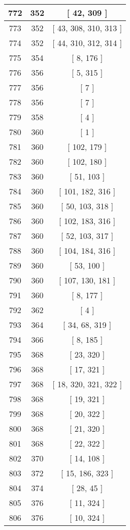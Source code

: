 \begin{center}
\begin{longtable}[H]{|| c c c ||}
\hline
772 & 352 & [ 42, 309 ] \\ 
\hline
773 & 352 & [ 43, 308, 310, 313 ] \\ 
\hline
774 & 352 & [ 44, 310, 312, 314 ] \\ 
\hline
775 & 354 & [ 8, 176 ] \\ 
\hline
776 & 356 & [ 5, 315 ] \\ 
\hline
777 & 356 & [ 7 ] \\ 
\hline
778 & 356 & [ 7 ] \\ 
\hline
779 & 358 & [ 4 ] \\ 
\hline
780 & 360 & [ 1 ] \\ 
\hline
781 & 360 & [ 102, 179 ] \\ 
\hline
782 & 360 & [ 102, 180 ] \\ 
\hline
783 & 360 & [ 51, 103 ] \\ 
\hline
784 & 360 & [ 101, 182, 316 ] \\ 
\hline
785 & 360 & [ 50, 103, 318 ] \\ 
\hline
786 & 360 & [ 102, 183, 316 ] \\ 
\hline
787 & 360 & [ 52, 103, 317 ] \\ 
\hline
788 & 360 & [ 104, 184, 316 ] \\ 
\hline
789 & 360 & [ 53, 100 ] \\ 
\hline
790 & 360 & [ 107, 130, 181 ] \\ 
\hline
791 & 360 & [ 8, 177 ] \\ 
\hline
792 & 362 & [ 4 ] \\ 
\hline
793 & 364 & [ 34, 68, 319 ] \\ 
\hline
794 & 366 & [ 8, 185 ] \\ 
\hline
795 & 368 & [ 23, 320 ] \\ 
\hline
796 & 368 & [ 17, 321 ] \\ 
\hline
797 & 368 & [ 18, 320, 321, 322 ] \\ 
\hline
798 & 368 & [ 19, 321 ] \\ 
\hline
799 & 368 & [ 20, 322 ] \\ 
\hline
800 & 368 & [ 21, 320 ] \\ 
\hline
801 & 368 & [ 22, 322 ] \\ 
\hline
802 & 370 & [ 14, 108 ] \\ 
\hline
803 & 372 & [ 15, 186, 323 ] \\ 
\hline
804 & 374 & [ 28, 45 ] \\ 
\hline
805 & 376 & [ 11, 324 ] \\ 
\hline
806 & 376 & [ 10, 324 ] \\ 

\end{longtable}
\end{center}
